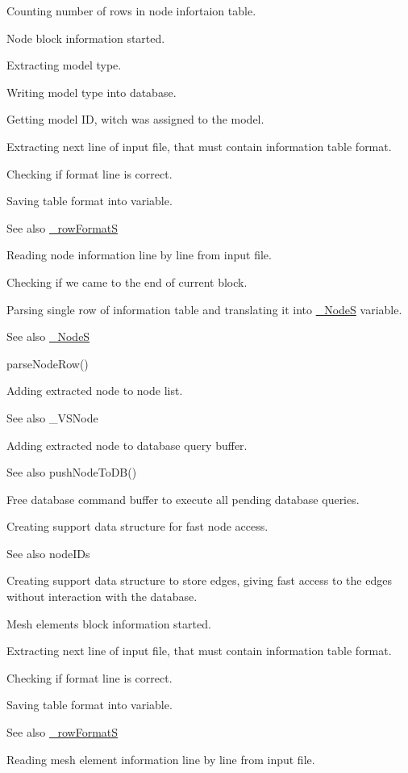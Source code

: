 Counting number of rows in node infortaion table.

Node block information started.

Extracting model type.

Writing model type into database.

Getting model ID, witch was assigned to the model.

Extracting next line of input file, that must contain information table format.

Checking if format line is correct.

Saving table format into variable. \begin{DoxySeeAlso}{See also}
\hyperlink{struct__row_format_s}{\+\_\+row\+FormatS}
\end{DoxySeeAlso}
Reading node information line by line from input file.

Checking if we came to the end of current block.

Parsing single row of information table and translating it into \hyperlink{struct___node_s}{\+\_\+\+NodeS} variable. \begin{DoxySeeAlso}{See also}
\hyperlink{struct___node_s}{\+\_\+\+NodeS} 

parse\+Node\+Row()
\end{DoxySeeAlso}
Adding extracted node to node list. \begin{DoxySeeAlso}{See also}
\+\_\+\+V\+S\+Node
\end{DoxySeeAlso}
Adding extracted node to database query buffer. \begin{DoxySeeAlso}{See also}
push\+Node\+To\+D\+B()
\end{DoxySeeAlso}
Free database command buffer to execute all pending database queries.

Creating support data structure for fast node access. \begin{DoxySeeAlso}{See also}
node\+I\+Ds
\end{DoxySeeAlso}
Creating support data structure to store edges, giving fast access to the edges without interaction with the database.

Mesh elements block information started.

Extracting next line of input file, that must contain information table format.

Checking if format line is correct.

Saving table format into variable. \begin{DoxySeeAlso}{See also}
\hyperlink{struct__row_format_s}{\+\_\+row\+FormatS}
\end{DoxySeeAlso}
Reading mesh element information line by line from input file.

